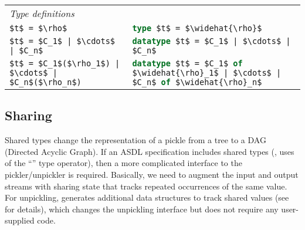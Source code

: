 \begin{table}[tp]
\begin{center}
\begin{tabular}{|l|p{3in}|}
      \hline
      \textit{Type definitions} & \\[0.25em]
      \lstinline[language=ASDL,mathescape=true]@$t$ = $\rho$@
        & \lstinline[language=SML,mathescape=true]!type $t$ = $\widehat{\rho}$! \\[0.5em]
      \lstinline[language=ASDL,mathescape=true]@$t$ = $C_1$ | $\cdots$ | $C_n$@
        & \lstinline[language=SML,mathescape=true]!datatype $t$ = $C_1$ | $\cdots$ | $C_n$! \\[0.5em]
      \lstinline[language=ASDL,mathescape=true]@$t$ = $C_1$($\rho_1$) | $\cdots$ | $C_n$($\rho_n$)@
        & \lstinline[language=SML,mathescape=true]!datatype $t$ = $C_1$ of $\widehat{\rho}_1$ | $\cdots$ | $C_n$ of $\widehat{\rho}_n$! \\[0.25em]
      \hline
    \end{tabular}%
  \end{center}%
\end{table}%

\subsection{Sharing}
Shared types change the representation of a pickle from a tree to a DAG
(Directed Acyclic Graph).
If an ASDL specification includes shared types (\ie{}, uses of the ``\kw{!}''
type operator), then a more complicated interface to the pickler/unpickler
is required.
Basically, we need to augment the input and output streams with sharing
state that tracks repeated occurrences of the same value.
For unpickling, \asdlgen{} generates additional data structures to track
shared values (see  for details), which changes
the unpickling interface but does not require any user-supplied code.

